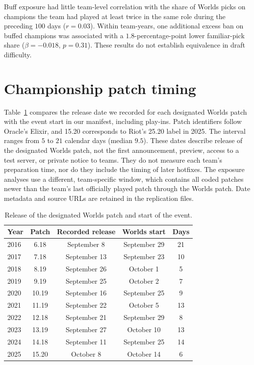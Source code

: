 \documentclass[11pt]{article}
\begin{document}
Buff exposure had little team-level correlation with the share of Worlds picks on champions the team had played at least twice in the same role during the preceding $100$ days ($r = 0.03$). Within team-years, one additional excess ban on buffed champions was associated with a $1.8$-percentage-point lower familiar-pick share ($\beta = -0.018$, $p = 0.31$). These results do not establish equivalence in draft difficulty.


\section{Championship patch timing}
\label{app:timing}
Table~\ref{tab:timing} compares the release date we recorded for each designated Worlds patch with the event start in our manifest, including play-ins. Patch identifiers follow Oracle's Elixir, and 15.20 corresponds to Riot's 25.20 label in 2025. The interval ranges from $5$ to $21$ calendar days (median $9.5$). These dates describe release of the designated Worlds patch, not the first announcement, preview, access to a test server, or private notice to teams. They do not measure each team's preparation time, nor do they include the timing of later hotfixes. The exposure analyses use a different, team-specific window, which contains all coded patches newer than the team's last officially played patch through the Worlds patch. Date metadata and source URLs are retained in the replication files.

\begin{table}[htbp]
\centering
\small
\caption{Release of the designated Worlds patch and start of the event.}
\label{tab:timing}
\begin{tabular}{lcccc}
\toprule
Year & Patch & Recorded release & Worlds start & Days \\
\midrule
2016 & 6.18 & September 8 & September 29 & 21 \\
2017 & 7.18 & September 13 & September 23 & 10 \\
2018 & 8.19 & September 26 & October 1 & 5 \\
2019 & 9.19 & September 25 & October 2 & 7 \\
2020 & 10.19 & September 16 & September 25 & 9 \\
2021 & 11.19 & September 22 & October 5 & 13 \\
2022 & 12.18 & September 21 & September 29 & 8 \\
2023 & 13.19 & September 27 & October 10 & 13 \\
2024 & 14.18 & September 11 & September 25 & 14 \\
2025 & 15.20 & October 8 & October 14 & 6 \\
\bottomrule
\end{tabular}
\end{table}
\end{document}
